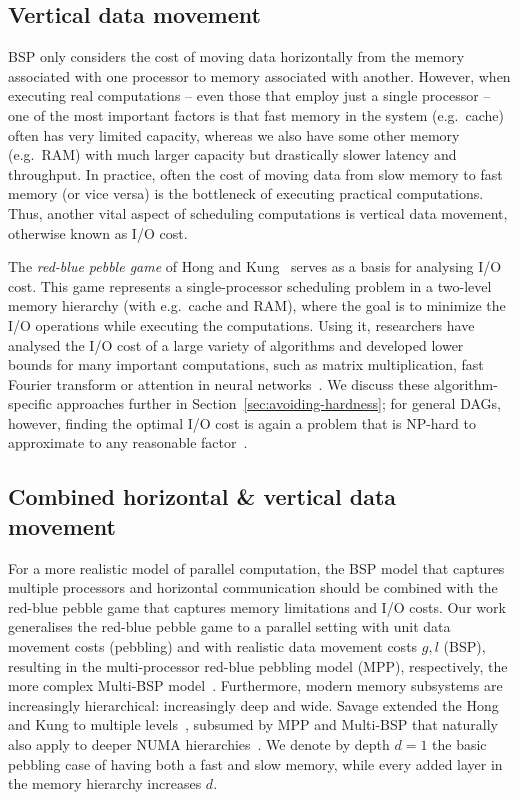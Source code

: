 \documentclass[oneside,reqno, a4paper]{amsart}
\numberwithin{equation}{section}
\begin{document}
\subsection{Vertical data movement} %
\label{sec:scheduling-is-hard:vertical}

BSP only considers the cost of moving data horizontally from the memory associated with one processor to memory associated with another. However, when executing real computations -- even those that employ just a single processor -- one of the most important factors is that fast memory in the system (e.g.\ cache) often has very limited capacity, whereas we also have some other memory (e.g.\ RAM) with much larger capacity but drastically slower latency and throughput. In practice, often the cost of moving data from slow memory to fast memory (or vice versa) is the bottleneck of executing practical computations.
Thus, another vital aspect of scheduling computations is vertical data movement,
otherwise known as I/O cost.

The \emph{red-blue pebble game} of Hong and Kung~\cite{HongKung} serves as a basis for analysing I/O cost.
This game represents a single-processor scheduling problem in a two-level memory hierarchy (with e.g.\ cache and RAM), where the goal is to minimize the I/O operations while executing the computations.
Using it, researchers have analysed the I/O cost of a large variety of algorithms and developed lower bounds for many important computations, such as matrix multiplication, fast Fourier transform or attention in neural networks~\cite{HongKung,Saha}.
We discuss these algorithm-specific approaches further in Section~\ref{sec:avoiding-hardness};
for general DAGs, however,
finding the optimal I/O cost is again a problem that is NP-hard to approximate to any reasonable factor~\cite{MPP_opdas}.

\subsection{Combined horizontal \& vertical data movement}
\label{sec:scheduling-is-hard:combined}

For a more realistic model of parallel computation,
the BSP model that captures multiple processors and horizontal communication
should be combined with the red-blue pebble game that captures memory limitations and I/O costs.
Our work generalises the red-blue pebble game to a parallel setting with unit data movement costs (pebbling) and with realistic data movement costs $g,l$ (BSP),
resulting in the multi-processor red-blue pebbling model (MPP), respectively, the more complex Multi-BSP model~\cite{valiant11}.
Furthermore,
modern memory subsystems are increasingly hierarchical:
increasingly deep and wide.
Savage extended the Hong and Kung to multiple levels~\cite{savage95},
subsumed by MPP and Multi-BSP that naturally also apply to deeper NUMA hierarchies~\cite{valiant11,MPP_opdas,multiBSP_opdas}.
We denote by depth $d=1$ the basic pebbling case of having both a fast and slow memory,
while every added layer in the memory hierarchy increases $d$.
\end{document}
